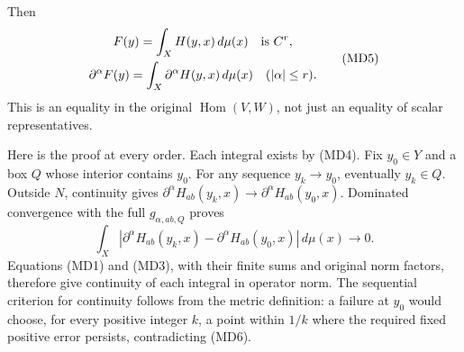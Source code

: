 \documentclass[
  11pt,
]{article}
\begin{document}
Then \[
\begin{gathered}
F(y)=\int_X H(y,x)\,d\mu(x)\quad\hbox{is }C^r,\\
\partial^\alpha F(y)=\int_X\partial^\alpha H(y,x)\,d\mu(x)
\quad(|\alpha|\leq r).
\end{gathered}
\tag{MD5}
\] This is an equality in the original \(\operatorname{Hom}(V,W)\), not
just an equality of scalar representatives.

Here is the proof at every order. Each integral exists by (MD4). Fix
\(y_0\in Y\) and a box \(Q\) whose interior contains \(y_0\). For any
sequence \(y_k\to y_0\), eventually \(y_k\in Q\). Outside \(N\),
continuity gives
\(\partial^\alpha H_{ab}(y_k,x)\to\partial^\alpha H_{ab}(y_0,x)\).
Dominated convergence with the full \(g_{\alpha,ab,Q}\) proves \[
 \int_X\left|
       \partial^\alpha H_{ab}(y_k,x)
          -\partial^\alpha H_{ab}(y_0,x)\right|\,d\mu(x)
                       \longrightarrow0 .
\tag{MD6}
\] Equations (MD1) and (MD3), with their finite sums and original norm
factors, therefore give continuity of each integral in operator norm.
The sequential criterion for continuity follows from the metric
definition: a failure at \(y_0\) would choose, for every positive
integer \(k\), a point within \(1/k\) where the required fixed positive
error persists, contradicting (MD6).
\end{document}
